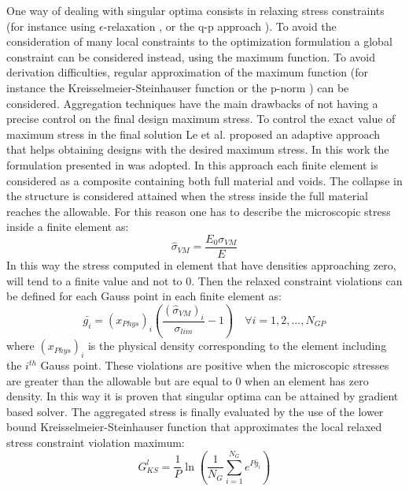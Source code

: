 One way of dealing with singular optima consists in relaxing stress constraints (for instance using $\epsilon$-relaxation \cite{cheng1997varepsilon}, or the q-p approach \cite{bruggi2008alternative}). To avoid the consideration of many local constraints to the optimization formulation a global constraint can be considered instead, using the maximum function.  To avoid derivation difficulties, regular approximation of the maximum function (for instance the Kreisselmeier-Steinhauser
function \cite{kreisselmeier1980systematic,yang1996stress} or the p-norm \cite{duysinx1998new} ) can be considered. Aggregation techniques have the main drawbacks of not having a precise control on the final design maximum stress. To control the exact value of maximum stress in the final solution Le et al. \cite{le2010stress} proposed an adaptive approach that helps obtaining designs with the desired maximum stress.  In this work the formulation presented in \cite{verbart2017unified} was adopted.
In this approach each finite element is considered as a composite containing both full material and voids. The collapse in the structure is considered attained when the stress inside the full material reaches the allowable. For this reason one has to describe the microscopic stress inside a finite element as:
\begin{equation}
\hat{\sigma}_{VM}=\frac{E_0\sigma_{VM}}{E}
\end{equation}
In this way the stress computed in element that have densities approaching zero, will tend to a finite value and not to 0. Then the relaxed constraint violations can be defined for each Gauss point in each finite element as:
\begin{equation}
\label{eq.2.30}
\bar{g_i}=(x_{Phys})_i\left(\frac{(\hat{\sigma}_{VM})_i}{\sigma_{lim}}-1\right) \quad \forall i=1,2,...,N_{GP}
\end{equation}
where $(x_{Phys})_i$ is the physical density corresponding to the element including the $i^{th}$ Gauss point.
These violations are positive when the microscopic stresses are greater than the allowable but are equal to 0 when an element has zero density. In this way it is proven that singular optima can be attained by gradient based solver.
The aggregated stress is finally evaluated by the use of the lower bound Kreisselmeier-Steinhauser
function \cite{kreisselmeier1980systematic} that approximates the local relaxed stress constraint violation maximum:
\begin{equation}
\label{e.KSl}
G^{l}_{KS}=\frac{1}{P}\ln\left(\frac{1}{N_G}\sum_{i=1}^{N_G}e^{P\bar{g}_i}\right)
\end{equation}
